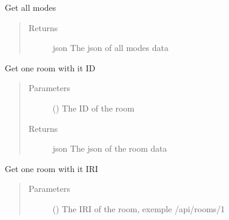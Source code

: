 \documentclass[letterpaper,10pt,english]{sphinxmanual}
\begin{document}
\begin{fulllineitems}

\begin{fulllineitems}
\label{\detokenize{index:Api.Api.get_modes}}
\sphinxAtStartPar
Get all modes
\begin{quote}\begin{description}
\item[{Returns}] \leavevmode
\sphinxAtStartPar
json \textendash{} The json of all modes data

\end{description}\end{quote}

\end{fulllineitems}


\begin{fulllineitems}
\label{\detokenize{index:Api.Api.get_room_by_id}}
\sphinxAtStartPar
Get one room with it ID
\begin{quote}\begin{description}
\item[{Parameters}] \leavevmode
\sphinxAtStartPar
{} () \textendash{} The ID of the room

\item[{Returns}] \leavevmode
\sphinxAtStartPar
json \textendash{} The json of the room data

\end{description}\end{quote}

\end{fulllineitems}


\begin{fulllineitems}
\label{\detokenize{index:Api.Api.get_room_by_iri}}
\sphinxAtStartPar
Get one room with it IRI
\begin{quote}\begin{description}
\item[{Parameters}] \leavevmode
\sphinxAtStartPar
{} () \textendash{} The IRI of the room, exemple /api/rooms/1


\end{description}
\end{quote}
\end{fulllineitems}
\end{fulllineitems}
\end{document}
